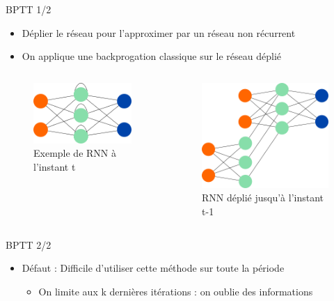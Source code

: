 \begin{frame}{BPTT 1/2}
	\begin{itemize}
		\item Déplier le réseau pour l'approximer par un réseau non récurrent 
		\item On applique une backprogation classique sur le réseau déplié
	\end{itemize}
    \begin{columns}
        \begin{column}{0.48\textwidth}
            \begin{figure}
                \includegraphics[width=.7\textwidth]{images/RNN_BPTT_ex}
                \caption{Exemple de RNN à l'instant t}
            \end{figure}
        \end{column}
        \begin{column}{0.48\textwidth}
            \begin{figure}
                \includegraphics[width=.7\textwidth]{images/RNN_BPTT_dep_ex}
                \caption{RNN déplié jusqu'à l'instant t-1}
            \end{figure}
        \end{column}
    \end{columns}	
\end{frame}

\begin{frame}{BPTT 2/2}
	\begin{itemize}
		\item Défaut : Difficile d'utiliser cette méthode sur toute la période
		 \begin{itemize}
		 	\item On limite aux k dernières itérations : on oublie des informations
		 \end{itemize}
	\end{itemize}
\end{frame}